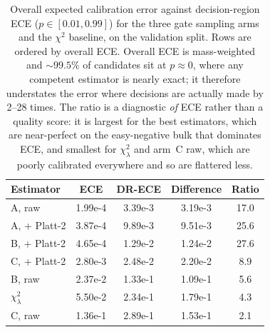 \begin{table}[htbp]
  \centering
  \caption[Overall versus decision-region calibration error]{%
    Overall expected calibration error against decision-region ECE
    ($p \in [0.01, 0.99]$) for the three gate sampling arms and the
    $\chi^2$ baseline, on the validation split. Rows are ordered by overall
    ECE. Overall ECE is mass-weighted and ${\sim}99.5\%$ of candidates sit
    at $p \approx 0$, where any competent estimator is nearly exact; it
    therefore understates the error where decisions are actually made by
    \numrange{2}{28} times. The ratio is a diagnostic \emph{of} ECE rather
    than a quality score: it is largest for the best estimators, which are
    near-perfect on the easy-negative bulk that dominates ECE, and smallest
    for $\chi^2_\lambda$ and arm~C raw, which are poorly calibrated
    everywhere and so are flattered less.}
  \label{tab:gate-ece-vs-dr-ece}
  \begin{tabular}{l S S S S[table-format=2.1]}
    \toprule
    Estimator & {ECE} & {DR-ECE} & {Difference} & {Ratio} \\
    \midrule
    A, raw           & 1.99e-4 & 3.39e-3 & 3.19e-3 & 17.0 \\
    A, + Platt-2     & 3.87e-4 & 9.89e-3 & 9.51e-3 & 25.6 \\
    B, + Platt-2     & 4.65e-4 & 1.29e-2 & 1.24e-2 & 27.6 \\
    C, + Platt-2     & 2.80e-3 & 2.48e-2 & 2.20e-2 & 8.9 \\
    B, raw           & 2.37e-2 & 1.33e-1 & 1.09e-1 & 5.6 \\
    $\chi^2_\lambda$ & 5.50e-2 & 2.34e-1 & 1.79e-1 & 4.3 \\
    C, raw           & 1.36e-1 & 2.89e-1 & 1.53e-1 & 2.1 \\
    \bottomrule
  \end{tabular}
\end{table}
